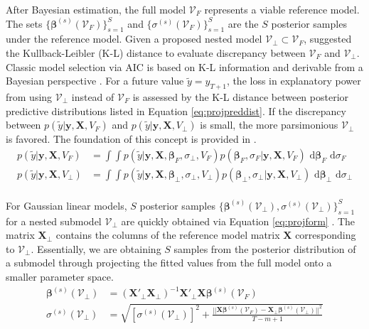 After Bayesian estimation, the full model $\mathcal{V}_F$ represents a viable reference model. The sets $\{\bm{\beta}^{(s)}(\mathcal{V}_F)\}_{s=1}^S$ and $\{\sigma^{(s)}(\mathcal{V}_F)\}_{s=1}^S$ are the $S$ posterior samples under the reference model. Given a proposed nested model $\mathcal{V}_\perp \subset \mathcal{V}_F$, \cite{Goutis1998} suggested the Kullback-Leibler (K-L) distance \citep{Kullback1951} to evaluate discrepancy between $\mathcal{V}_F$ and $\mathcal{V}_\perp$. Classic model selection via AIC is based on K-L information and derivable from a Bayesian perspective \citep{Akaike1974,Akaike1985,burnham2003,Burnham2004}. For a future value $\tilde{y}=y_{T+1}$, the loss in explanatory power from using $\mathcal{V}_\perp$ instead of $\mathcal{V}_F$  is assessed by the K-L distance between posterior predictive distributions listed in Equation \ref{eq:projpreddist}. If the discrepancy between $p(\tilde{y}|\bm{y},\bm{X},V_F)$ and $p(\tilde{y}|\bm{y},\bm{X},V_\perp)$ is small, the more parsimonious $\mathcal{V}_\perp$ is favored.  The foundation of this concept is provided in \cite{Dupuis2003,Nott2010,vehtari2012,Piironen2015b,Piironen2017}.
\begin{equation}
\label{eq:projpreddist}
\begin{split}
p(\tilde{y}|\bm{y},\bm{X},V_F)&=\int\int p(\tilde{y}|\bm{y},\bm{X},\bm{\beta}_F,\sigma_\perp,V_F)p(\bm{\beta}_F,\sigma_F|\bm{y},\bm{X},V_F) \textrm{ d}\bm{\beta}_F \textrm{ d}\sigma_F\\
p(\tilde{y}|\bm{y},\bm{X},V_\perp)&=\int\int p(\tilde{y}|\bm{y},\bm{X},\bm{\beta}_\perp,\sigma_\perp,V_\perp)p(\bm{\beta}_\perp,\sigma_\perp|\bm{y},\bm{X},V_\perp) \textrm{ d}\bm{\beta}_\perp \textrm{ d}\sigma_\perp\\
\end{split}
\end{equation}


For Gaussian linear models, $S$ posterior samples $\{\bm{\beta}^{(s)}(\mathcal{V}_\perp),\sigma^{(s)}(\mathcal{V}_\perp)\}_{s=1}^S$ for a nested submodel $\mathcal{V}_\perp$ are quickly obtained via Equation \ref{eq:projform}  \citep{Piironen2015b}. The matrix $\bm{X}_\perp$ contains the columns of the reference model matrix $\bm{X}$ corresponding to $\mathcal{V}_\perp$. Essentially, we are obtaining $S$ samples from the posterior distribution of a submodel through projecting the fitted values from the full model  onto a smaller parameter space.
\begin{equation}
\label{eq:projform}
\begin{split}
	\bm{\beta}^{(s)}(\mathcal{V}_\perp) &= (\bm{X}'_\perp\bm{X}_\perp)^{-1}\bm{X}'_\perp\bm{X}\bm{\beta}^{(s)}(\mathcal{V}_F) \\
	\sigma^{(s)}(\mathcal{V}_\perp) &=\sqrt{[\sigma^{(s)}(\mathcal{V}_\perp)]^2+\frac{||\bm{X}\bm{\beta}^{(s)}(\mathcal{V}_F)-\bm{X}_\perp \bm{\beta}^{(s)}(\mathcal{V}_\perp)||^2}{T-m+1}}
\end{split}
\end{equation}

